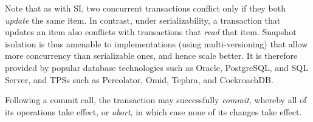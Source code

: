  
Note that as with SI, two concurrent transactions conflict only if they both \emph{update} the same item.  
In contrast, under serializability, a transaction that updates an item also conflicts with transactions that \emph{read} that item. 
Snapshot isolation is thus amenable to implementations (using multi-versioning) that 
allow more concurrency than serializable ones, and hence scale better.
It is therefore provided by popular database technologies such as Oracle, PostgreSQL, and SQL Server,
and TPSs such as Percolator, Omid, Tephra, and  CockroachDB.

Following a commit call, the transaction may successfully \emph{commit}, whereby all of its operations take effect, 
or 
\emph{abort}, in which case none of its changes take effect. 





